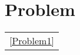 \documentclass[11pt]{article}
\begin{document}
\section{Problem}
\label{sec:orgda7aacd}
\begin{center}
\begin{tabular}{l}
\ref{Problem1}\\
\end{tabular}
\end{center}
\end{document}
